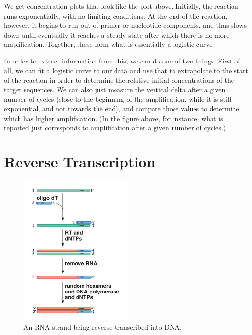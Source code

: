 \documentclass{article}
\begin{document}
We get concentration plots that look like the plot above. Initially, the reaction runs
exponentially, with no limiting conditions. At the end of the reaction, however, it begins to run
out of primer or nucleotide components, and thus slows down until eventually it reaches a steady
state after which there is no more amplification. Together, these form what is essentially a
logistic curve.

In order to extract information from this, we can do one of two things. First of all, we can fit a
logistic curve to our data and use that to extrapolate to the start of the reaction in order to
determine the relative initial concentrations of the target sequences. We can also just measure the
vertical delta after a given number of cycles (close to the beginning of the amplification, while it
is still exponential, and not towards the end), and compare those values to determine which has
higher amplification. (In the figure above, for instance, what is reported just corresponds to
amplification after a given number of cycles.)

\clearpage
\section*{Reverse Transcription}

\begin{figure}[h!]
    \begin{center}
        \includegraphics[width=0.5\textwidth]{images/reverse-transcription.png}
    \end{center}
    \caption{
        An RNA strand being reverse transcribed into DNA.\@
    }
\end{figure}
\end{document}
